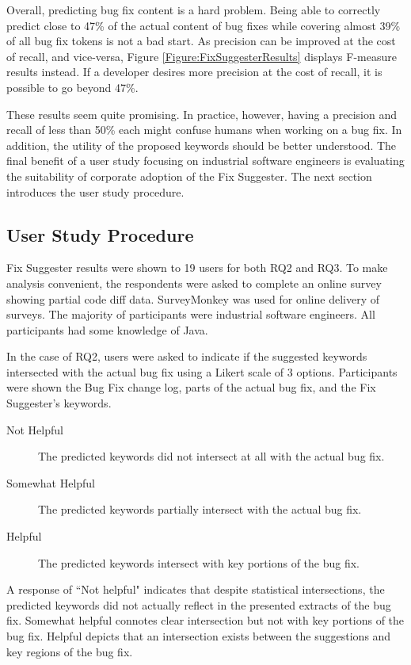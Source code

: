 \documentclass[10pt, conference, letterpaper, compsocconf]{IEEEtran}
\begin{document}
Overall, predicting bug fix content is a hard problem. Being able to correctly predict close to 47\% of the actual content of bug fixes while covering almost 39\% of all bug fix tokens is not a bad start. As precision can be improved at the cost of recall, and vice-versa, Figure \ref{Figure:FixSuggesterResults} displays F-measure results instead. If a developer desires more precision at the cost of recall, it is possible to go beyond 47\%. 

These results seem quite promising. In practice, however, having a precision and recall of less than 50\% each might confuse humans when working on a bug fix. In addition, the utility of the proposed keywords should be better understood. The final benefit of a user study focusing on industrial software engineers is evaluating the suitability of corporate adoption of the Fix Suggester. The next section introduces the user study procedure.

\subsection{User Study Procedure}
Fix Suggester results were shown to 19 users for both RQ2 and RQ3. To make analysis convenient, the respondents were asked to complete an online survey showing partial code diff data. SurveyMonkey was used for online delivery of surveys. The majority of participants were industrial software engineers. All participants had some knowledge of Java.

In the case of RQ2, users were asked to indicate if the suggested keywords intersected with the actual bug fix using a Likert scale of 3 options. Participants were shown the Bug Fix change log, parts of the actual bug fix, and the Fix Suggester's keywords.

\begin{description}
	\item[Not Helpful] The predicted keywords did not intersect at all with the actual bug fix.
	\item[Somewhat Helpful] The predicted keywords partially intersect with the actual bug fix.
	\item[Helpful] The predicted keywords intersect with key portions of the bug fix.
\end{description}

A response of ``Not helpful" indicates that despite statistical intersections, the predicted keywords did not actually reflect in the presented extracts of the bug fix. Somewhat helpful connotes clear intersection but not with key portions of the bug fix. Helpful depicts that an intersection exists between the suggestions and key regions of the bug fix.
\end{document}
